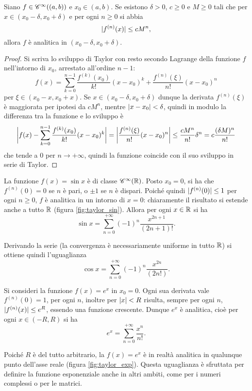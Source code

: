 \begin{teorema}
Siano $f\in\cont[\infty]{(a,b)}$ e $x_0\in(a,b)$. Se esistono $\delta>0$, $c\geq 0$ e $M\geq 0$ tali che per $x\in(x_0-\delta,x_0+\delta)$ e per ogni $n\geq 0$ si abbia
\[
\abs{f^{(n)}(x)}\leq cM^n,
\]
allora $f$ è analitica in $(x_0-\delta,x_0+\delta)$.
\end{teorema}
\begin{proof}
Si scriva lo sviluppo di Taylor con resto secondo Lagrange della funzione $f$ nell'intorno di $x_0$, arrestato all'ordine $n-1$:
\[
f(x)=\sum_{k=0}^{n-1}\frac{f^{(k)}(x_0)}{k!}(x-x_0)^k+\frac{f^{(n)}(\xi)}{n!}(x-x_0)^n
\]
per $\xi\in(x_0-x,x_0+x)$. Se $x\in(x_0-\delta,x_0+\delta)$ dunque la derivata $f^{(n)}(\xi)$ è maggiorata per ipotesi da $cM^n$, mentre $\abs{x-x_0}<\delta$, quindi in modulo la differenza tra la funzione e lo sviluppo è
\[
	\abs[\bigg]{f(x)-\sum_{k=0}^{n-1}\frac{f^{(k)}(x_0)}{k!}(x-x_0)^k}=\abs[\bigg]{\frac{f^{(n)}(\xi)}{n!}(x-x_0)^n}\leq\frac{cM^n}{n!}\delta^n=c\frac{(\delta M)^n}{n!}
\]
che tende a 0 per $n\to+\infty$, quindi la funzione coincide con il suo sviluppo in serie di Taylor.
\end{proof}
\begin{esempio} \label{es:funzioni-analitiche-sin-cos}
	La funzione $f(x)=\sin x$ è di classe $\cont[\infty]{\R}$. Posto $x_0=0$, si ha che $f^{(n)}(0)=0$ se $n$ è pari, o $\pm 1$ se $n$ è dispari. Poiché quindi $\abs{f^{(n)}(0)}\leq 1$ per ogni $n\geq 0$, $f$ è analitica in un intorno di $x=0$: chiaramente il risultato si estende anche a tutto $\R$ (figura \ref{fig:taylor_sin}).
	Allora per ogni $x\in\R$ si ha
	\[
	\sin x=\sum_{n=0}^{+\infty}(-1)^n\frac{x^{2n+1}}{(2n+1)!}.
	\]
	
	Derivando la serie (la convergenza è necessariamente uniforme in tutto $\R$) si ottiene quindi l'uguaglianza
	\[
	\cos x=\sum_{n=0}^{+\infty}(-1)^n\frac{x^{2n}}{(2n!)}.
	\]
\end{esempio}
\begin{esempio} \label{es:funzioni-analitiche-exp}
	Si consideri la funzione $f(x)=e^x$ in $x_0=0$. Ogni sua derivata vale $f^{(n)}(0)=1$, per ogni $n$, inoltre per $\abs{x}<R$ risulta, sempre per ogni $n$, $\abs{f^{(n)}(x)}\leq e^R$, essendo una funzione crescente. Dunque $e^x$ è analitica, cioè per ogni $x\in(-R,R)$ si ha
	\[
	e^x=\sum_{n=0}^{+\infty}\frac{x^n}{n!}.
	\]
	
	Poiché $R$ è del tutto arbitrario, la $f(x)=e^x$ è in realtà analitica in qualunque punto dell'asse reale (figura \ref{fig:taylor_exp}).
	Questa uguaglianza è sfruttata per definire la funzione esponenziale anche in altri ambiti, come per i numeri complessi o per le matrici.
\end{esempio}

